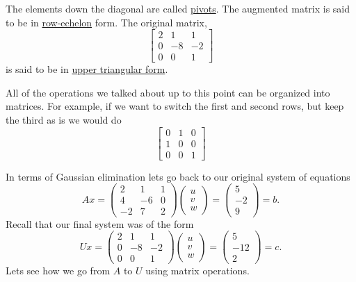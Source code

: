 \documentclass[reqno]{amsart}
\theoremstyle{definition}
\begin{document}
The elements down the diagonal are called \underline{pivots}.  The augmented matrix is said to be in 
\underline{row-echelon} form.  The original matrix,
%
\begin{equation*}
\begin{bmatrix}
2 & 1 & 1\\
0 & -8 & -2\\
0 & 0 & 1
\end{bmatrix}
\end{equation*}
%
is said to be in \underline{upper triangular form}.

All of the operations we talked about up to this point can be organized into matrices.
For example, if we want to switch the first and second rows, but keep the third as is
we would do
%
\begin{equation*}
\begin{bmatrix}
0 & 1 & 0\\
1 & 0 & 0\\
0 & 0 & 1
\end{bmatrix}
\end{equation*}
%

In terms of Gaussian elimination lets go back to our original system of equations
%
\begin{equation}
Ax = \begin{pmatrix}
2 & 1 & 1\\
4 & -6 & 0\\
-2 & 7 & 2
\end{pmatrix}\begin{pmatrix}
u\\
v\\
w
\end{pmatrix} = \begin{pmatrix}
5\\
-2\\
9
\end{pmatrix} = b.
\end{equation}
%
Recall that our final system was of the form
%
\begin{equation}
Ux = \begin{pmatrix}
2 & 1 & 1\\
0 & -8 & -2\\
0 & 0 & 1
\end{pmatrix}\begin{pmatrix}
u\\
v\\
w
\end{pmatrix} = \begin{pmatrix}
5\\
-12\\
2
\end{pmatrix} = c.
\end{equation}
%
Lets see how we go from $A$ to $U$ using matrix operations.
\end{document}

